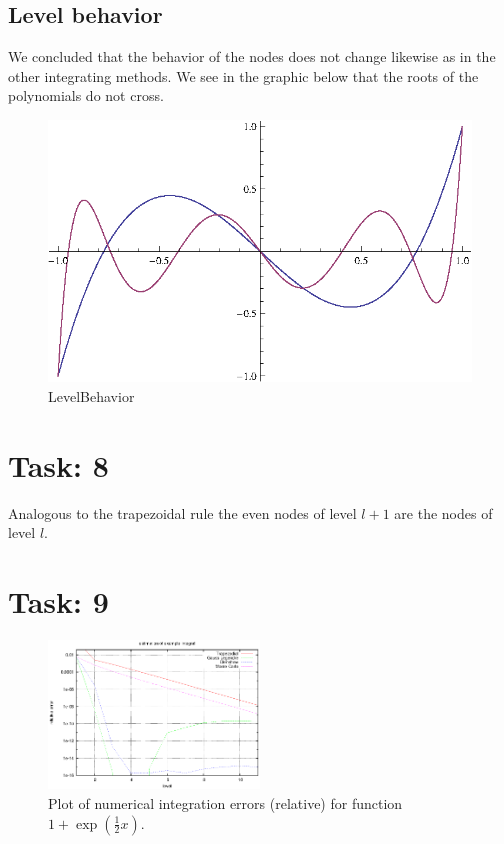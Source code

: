 \documentclass{article}
\begin{document}
\subsection*{Level behavior}
We concluded that the behavior of the nodes does not change likewise as in the other integrating methods. We see in the graphic below that the roots of the polynomials do not cross.
\begin{figure}[htbp]
  \centering
     \includegraphics[width=1.00\textwidth]{../Task07/LevelBehavior.eps}
   \caption{LevelBehavior}
\end{figure}

\section*{Task: 8}

Analogous to the trapezoidal rule the even nodes of level $l+1$ are the nodes of level $l$.

\section*{Task: 9}

\begin{figure}[htbp]
  \centering
     \includegraphics[width=0.50\textwidth]{../Task09/task9_convergence_plot.eps}
   \caption{Plot of numerical integration errors (relative) for function $1+\exp\left(\frac{1}{2}x\right)$.}
\end{figure}
\end{document}
